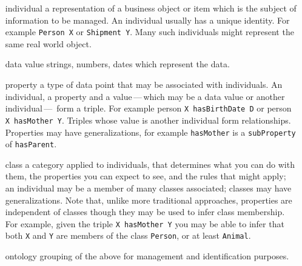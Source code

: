 \begin{itemize}[leftmargin=.8in,font=\itshape]
    \item [individual] a representation of a business object or item which is the subject of information to be managed.
                       An individual usually has a unique identity.
                       For example \lstinline|Person X| or \lstinline|Shipment Y|.
                       Many such individuals might represent the same real world object.
    \item [data value] strings, numbers, dates which represent the data.
    \item [property]   a type of data point that may be associated with individuals.
                       An individual, a property and a value\,---\,which may be a data value or another
                       individual\,---\, form a triple.\newline
                       For example person \lstinline|X hasBirthDate D| or person \lstinline|X hasMother Y|.
                       Triples whose value is another individual form relationships.
                       Properties may have generalizations, for example \lstinline|hasMother| is a
                       \lstinline|subProperty| of \lstinline|hasParent|.
    \item [class]      a category applied to individuals, that determines what you can do with them,
                       the properties you can expect to see, and the rules that might apply;
                       an individual may be a member of many classes associated;
                       classes may have generalizations.
                       Note that, unlike more traditional approaches, properties are independent of
                       classes though they may be used to infer class membership.
                       For example, given the triple \lstinline|X hasMother Y| you may be able to infer that both
                       \lstinline|X| and \lstinline|Y| are members of the class \lstinline|Person|,
                       or at least \lstinline|Animal|.
    \item [ontology]   grouping of the above for management and identification purposes.
\end{itemize}



\ekgmmCapabilitySectionDimensions

